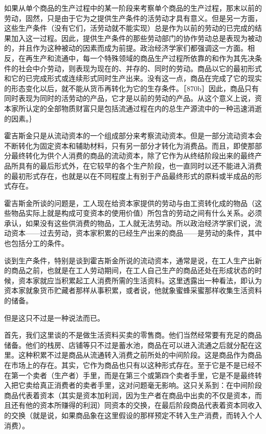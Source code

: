 如果从单个商品的生产过程中的某一阶段来考察单个商品的生产过程，那末以前的劳动，固然，只是由于它为之提供生产条件的活劳动才具有意义。但是另一方面，这些生产条件（没有它们，活劳动就不能实现）总是作为以前的劳动的已完成的结果加入这一过程。因此，提供生产条件的那些劳动部门的协作劳动总是表现为被动的，并且作为这种被动的因素而成为前提。政治经济学家们都强调这一方面。相反，在再生产和流通中，每一个特殊领域的商品生产过程所依靠的和作为其先决条件的社会中介劳动，则表现为现在的、并存的、同时的劳动。商品以它的最初形式和它的已完成形式或连续形式同时生产出来。没有这一点，商品在完成了它的现实的形态变化以后，就不能从货币再转化为它的生存条件。［870b］因此，商品只有同时表现为同时的活劳动的产品，它才是以前的劳动的产品。从这个意义上说，资本家所认定的全部物质财富只是包括流通过程在内的总生产源流中的一种迅速消逝的因素。｝


霍吉斯金只是从流动资本的一个组成部分来考察流动资本。但是一部分流动资本会不断转化为固定资本和辅助材料，只有另一部分才转化为消费品。而且，即使那部分最终转化为供个人消费的商品的流动资本，除了它作为从终结阶段出来的最终产品所具有的最后形式外，在它较早的各个生产阶段，也一直同时以还不能进入消费的最初形式存在，也就是以在不同程度上有别于产品最终形式的原料或半成品的形式存在。

霍吉斯金所谈的问题是，工人现在给资本家提供的劳动与由工资转化成的物品（这些物品实际上就是构成可变资本的使用价值）所包含的劳动之间有什么关系。必须承认，如果没有这些供消费的物品，工人就无法劳动。所以政治经济学家们说，流动资本——过去劳动，资本家积累的已经生产出来的商品——是劳动的条件，其中也包括分工的条件。

谈到生产条件，特别是谈到霍吉斯金所说的流动资本，通常是说，在工人生产出新的商品之前，也就是在工人劳动期间，在工人自己生产的商品还处在形成状态的时候，资本家就应当积累起工人消费所需的生活资料。这里透露出一种看法，即认为资本家就象货币贮藏者那样从事积累，或者说，他就象蜜蜂采蜜那样收集生活资料的储备。

但是这只不过是一种说法而已。

首先，我们这里谈的不是做生活资料买卖的零售商。他们当然经常要有充足的商品储备。他们的栈房、店铺等只不过是蓄水池，商品在可以进入流通之后就分配在这里。这种积累不过是商品从流通转入消费之前所处的中间阶段。这是商品作为商品在市场上的存在。其实，它作为商品也只有以这种形式存在。至于它是不是已经不在第一个卖者（生产者）手里，而是在第三个或第四个卖者手里，它是不是最终转入把它卖给真正消费者的卖者手里，这对问题毫无影响。这只关系到：在中间阶段商品代表着资本（其实是资本加利润，因为生产者在商品中出卖的不仅是资本，而且还有他的资本所赚得的利润）同资本的交换，在最后阶段商品代表着资本同收入的交换（就是说，如果商品象在这里假设的那样预定不转入生产消费，而转入个人消费）。

